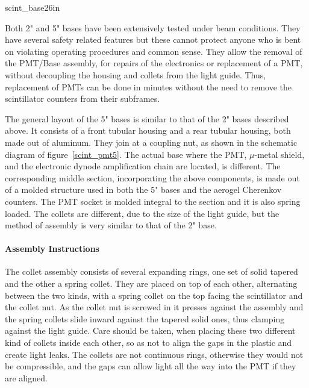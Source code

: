 {scint_base2}{6in}


   Both 2" and 5" bases have been extensively tested under beam conditions. 
They have several safety related features but these cannot protect anyone who 
is bent on violating operating procedures and common sense. They allow the 
removal of the PMT/Base assembly, for repairs of the electronics or replacement 
of a PMT, without decoupling the housing and collets from the light guide. 
Thus, replacement of PMTs can be done in minutes without the need to remove the 
scintillator counters from their subframes.




   The general layout of the 5" bases is similar to that of the 2" bases
described above. It consists of a front tubular housing and a rear tubular
housing, both made out of aluminum. They join at a coupling nut, as shown in
the schematic diagram of figure~\ref{scint_pmt5}. The actual base where the PMT, $\mu$-metal
shield, and the electronic dynode amplification chain are located, is
different. The corresponding middle section, incorporating the above
components, is made out of a molded structure used in both the 5" bases and
the aerogel Cherenkov counters. The PMT socket is molded integral to the
section and it is also spring loaded. The collets are different, due to the
size of the light guide, but the method of assembly is very similar to that of
the 2" base. 


\paragraph{Assembly Instructions}

   The collet assembly consists of several expanding rings, one set of solid
tapered and the other a spring collet. They are placed on top of each other,
alternating between the two kinds, with a spring collet on the top facing the
scintillator and the collet nut. As the collet nut is screwed in it presses
against the assembly and the spring collets slide inward against the tapered
solid ones, thus clamping against the light guide. Care should be taken, when
placing these two different kind of collets inside each other, so as not to
align the gaps in the plastic and create light leaks. The collets are not
continuous rings, otherwise they would not be compressible, and the gaps can
allow light all the way into the PMT if they are aligned. 

